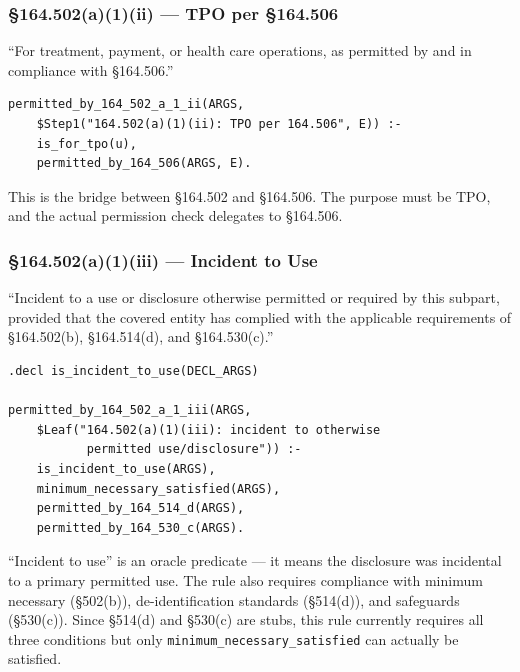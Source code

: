 \documentclass[11pt,letterpaper]{article}
\begin{document}
\subsubsection{\S 164.502(a)(1)(ii) --- TPO per \S 164.506}
\label{sec:502a1ii}

\begin{hipaabox}
``For treatment, payment, or health care operations, as permitted by and in compliance with \S 164.506.''
\end{hipaabox}

\begin{lstlisting}[style=soufflestyle,caption={\S 164.502(a)(1)(ii) --- delegates to \S 164.506}]
permitted_by_164_502_a_1_ii(ARGS,
    $Step1("164.502(a)(1)(ii): TPO per 164.506", E)) :-
    is_for_tpo(u),
    permitted_by_164_506(ARGS, E).
\end{lstlisting}

This is the bridge between \S 164.502 and \S 164.506. The purpose must be TPO, and the actual permission check delegates to \S 164.506.

\subsubsection{\S 164.502(a)(1)(iii) --- Incident to Use}

\begin{hipaabox}
``Incident to a use or disclosure otherwise permitted or required by this subpart, provided that the covered entity has complied with the applicable requirements of \S 164.502(b), \S 164.514(d), and \S 164.530(c).''
\end{hipaabox}

\begin{lstlisting}[style=soufflestyle,caption={\S 164.502(a)(1)(iii) --- incident to use}]
.decl is_incident_to_use(DECL_ARGS)

permitted_by_164_502_a_1_iii(ARGS,
    $Leaf("164.502(a)(1)(iii): incident to otherwise
           permitted use/disclosure")) :-
    is_incident_to_use(ARGS),
    minimum_necessary_satisfied(ARGS),
    permitted_by_164_514_d(ARGS),
    permitted_by_164_530_c(ARGS).
\end{lstlisting}

``Incident to use'' is an oracle predicate --- it means the disclosure was incidental to a primary permitted use. The rule also requires compliance with minimum necessary (\S 502(b)), de-identification standards (\S 514(d)), and safeguards (\S 530(c)). Since \S 514(d) and \S 530(c) are stubs, this rule currently requires all three conditions but only \texttt{minimum\_necessary\_satisfied} can actually be satisfied.
\end{document}
